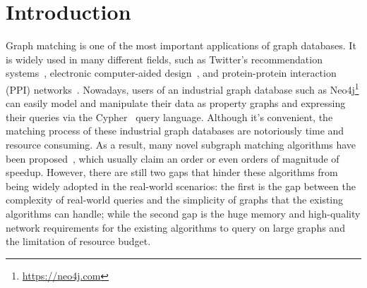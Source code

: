 \section{Introduction}
Graph matching is one of the most important applications of graph databases.
It is widely used in many different fields,
such as Twitter's recommendation systems~\cite{DBLP:journals/pvldb/GuptaSGGZLL14,DBLP:journals/pvldb/SharmaJBLL16},
electronic computer-aided design~\cite{DBLP:conf/dac/OhlrichEGS93},
and protein-protein interaction (PPI) networks~\cite{milenkovic2008uncovering}.
Nowadays, users of an industrial graph database such as Neo4j\footnote{\url{https://neo4j.com}}
can easily model and manipulate their data as property graphs and expressing their queries via the Cypher~\cite{DBLP:conf/sigmod/FrancisGGLLMPRS18} query language.
Although it's convenient, the matching process of these industrial graph databases are notoriously time and resource consuming.
As a result, many novel subgraph matching algorithms have been proposed~\cite{DBLP:journals/pvldb/SunWWSL12,DBLP:conf/sigmod/HanLL13,DBLP:conf/sigmod/ShaoCCMYX14,DBLP:conf/cloud/SerafiniMS17,DBLP:journals/pvldb/QiaoZC17,DBLP:conf/sigmod/DiasTGM019},
which usually claim an order or even orders of magnitude of speedup.
However, there are still two gaps that hinder these algorithms from being widely adopted in the real-world scenarios:
the first is the gap between the complexity of real-world queries and the simplicity of graphs that the existing algorithms can handle;
while the second gap is the huge memory and high-quality network requirements for the existing algorithms to query on large graphs and the limitation of resource budget.
